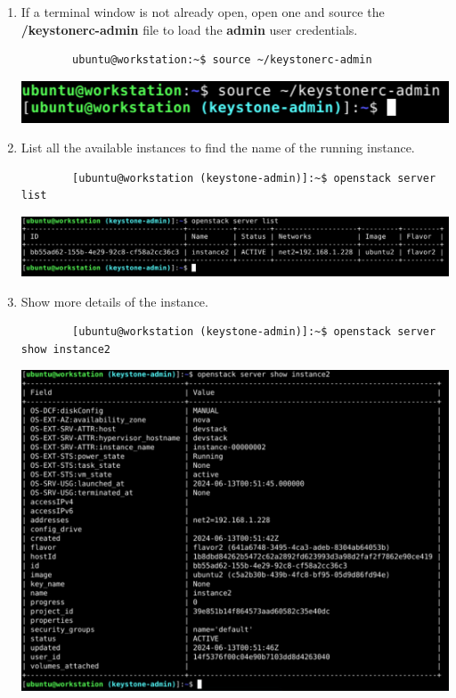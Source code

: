 \documentclass[letterpaper, 12pt]{article}
\begin{document}
\begin{enumerate}
    \item If a terminal window is not already open, open one and source the \textbf{\texttildemid/keystonerc-admin} file to load the \textbf{admin} user credentials.
    \begin{lstlisting}
        ubuntu@workstation:~$ source ~/keystonerc-admin
    \end{lstlisting}

    \begin{center}
        \includegraphics[width=\linewidth]{images/part5/step1.png}
    \end{center}

    \item List all the available instances to find the name of the running instance.
    \begin{lstlisting}
        [ubuntu@workstation (keystone-admin)]:~$ openstack server list
    \end{lstlisting}

    \begin{center}
        \includegraphics[width=\linewidth]{images/part5/step2.png}
    \end{center}

    \item Show more details of the instance.
    \begin{lstlisting}
        [ubuntu@workstation (keystone-admin)]:~$ openstack server show instance2
    \end{lstlisting}

    \begin{center}
        \includegraphics[width=\linewidth]{images/part5/step3.png}
    \end{center}


\end{enumerate}
\end{document}
